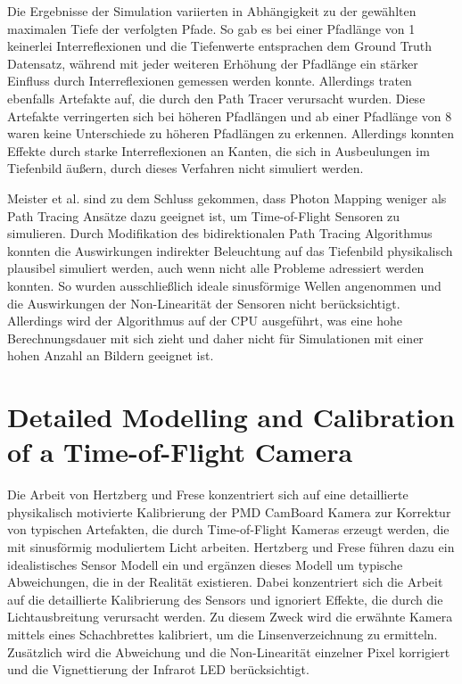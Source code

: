 \documentclass[thesis.tex]{subfiles}
\begin{document}
Die Ergebnisse der Simulation variierten in Abhängigkeit zu der gewählten maximalen Tiefe der verfolgten Pfade. So gab es bei einer Pfadlänge von 1 keinerlei Interreflexionen und die Tiefenwerte entsprachen dem Ground Truth Datensatz, während mit jeder weiteren Erhöhung der Pfadlänge ein stärker Einfluss durch Interreflexionen gemessen werden konnte. Allerdings traten ebenfalls Artefakte auf, die durch den Path Tracer verursacht wurden. Diese Artefakte verringerten sich bei höheren Pfadlängen und ab einer Pfadlänge von 8 waren keine Unterschiede zu höheren Pfadlängen zu erkennen. Allerdings konnten Effekte durch starke Interreflexionen an Kanten, die sich in \glq Ausbeulungen\grq{} im Tiefenbild äußern, durch dieses Verfahren nicht simuliert werden. 

Meister et al. \cite{bib:Meister2013} sind zu dem Schluss gekommen, dass Photon Mapping weniger als Path Tracing Ansätze dazu geeignet ist, um Time-of-Flight Sensoren zu simulieren. Durch Modifikation des bidirektionalen Path Tracing Algorithmus konnten die Auswirkungen indirekter Beleuchtung auf das Tiefenbild physikalisch plausibel simuliert werden, auch wenn nicht alle Probleme adressiert werden konnten. So wurden ausschließlich ideale sinusförmige Wellen angenommen und die Auswirkungen der Non-Linearität der Sensoren nicht berücksichtigt. Allerdings wird der Algorithmus auf der CPU ausgeführt, was eine hohe Berechnungsdauer mit sich zieht und daher nicht für Simulationen mit einer hohen Anzahl an Bildern geeignet ist.

\section{Detailed Modelling and Calibration of a Time-of-Flight Camera}

Die Arbeit von Hertzberg und Frese \cite{bib:Hertzberg2014} konzentriert sich auf eine detaillierte physikalisch motivierte Kalibrierung der PMD CamBoard Kamera zur Korrektur von typischen Artefakten, die durch Time-of-Flight Kameras erzeugt werden, die mit sinusförmig moduliertem Licht arbeiten. Hertzberg und Frese \cite{bib:Hertzberg2014} führen dazu ein idealistisches Sensor Modell ein und ergänzen dieses Modell um typische Abweichungen, die in der Realität existieren. Dabei konzentriert sich die Arbeit auf die detaillierte Kalibrierung des Sensors und ignoriert Effekte, die durch die Lichtausbreitung verursacht werden. Zu diesem Zweck wird die erwähnte Kamera mittels eines Schachbrettes kalibriert, um die Linsenverzeichnung zu ermitteln. Zusätzlich wird die Abweichung und die Non-Linearität einzelner Pixel korrigiert und die Vignettierung der Infrarot LED berücksichtigt.
\end{document}
